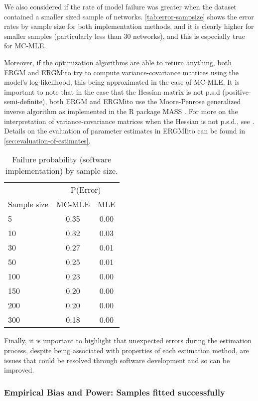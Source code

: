 \documentclass[review]{elsarticle}
\begin{document}
We also considered if the rate of model failure was greater when the dataset contained a smaller sized sample of networks. \autoref{tab:error-sampsize} shows the error rates by sample size for both implementation methods, and it is clearly higher for smaller samples (particularly less than 30 networks), and this is especially true for MC-MLE. 

Moreover, if the optimization algorithms are able to return anything, both ERGM and ERGMito try to compute variance-covariance matrices using the model's log-likelihood, this being approximated in the case of MC-MLE. It is important to note that in the case that the Hessian matrix is not p.s.d (positive-semi-definite), both ERGM and ERGMito use the Moore-Penrose generalized inverse algorithm as implemented in the R package MASS \cite{Venables2002}. For more on the interpretation of variance-covariance matrices when the Hessian is not p.s.d., see \cite{Gill2004}. Details on the evaluation of parameter estimates in ERGMIito can be found in \autoref{sec:evaluation-of-estimates}.

\begin{table}[ht]
	\centering
	\begin{tabular}{lcc}
		\toprule & \multicolumn{2}{c}{P(Error)} \\ \cmidrule(r){2-3}
		Sample size & MC-MLE & MLE \\ 
		\midrule
		5 & 0.35 & 0.00 \\ 
		10 & 0.32 & 0.03 \\ 
		30 & 0.27 & 0.01 \\ 
		50 & 0.25 & 0.01 \\ 
		100 & 0.23 & 0.00 \\ 
		150 & 0.20 & 0.00 \\ 
		200 & 0.20 & 0.00 \\ 
		300 & 0.18 & 0.00 \\ 
		\bottomrule
	\end{tabular}
	\caption{\label{tab:error-sampsize}Failure probability (software implementation) by sample size.} 
\end{table}


Finally, it is important to highlight that unexpected errors during the estimation process, despite being associated with properties of each estimation method, are issues that could be resolved through software development and so can be improved.

\subsubsection{Empirical Bias and Power: Samples fitted successfully}
\end{document}
